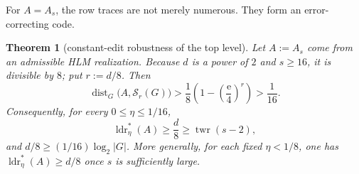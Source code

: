 \documentclass[11pt]{article}
\theoremstyle{plain}
\newtheorem{theorem}{Theorem}
\theoremstyle{definition}
\numberwithin{theorem}{section}
\newcommand{\abs}[1]{\lvert #1\rvert}
\newcommand{\twr}{\operatorname{twr}}
\newcommand{\ldrs}{\operatorname{ldr}^{*}}
\newcommand{\Stable}{\mathcal{S}}
\newcommand{\econst}{\mathrm e}
\begin{document}
For $A=A_s$, the row traces are not merely numerous.  They form an
error-correcting code.

\begin{theorem}[constant-edit robustness of the top level]\label{thm:robust}
Let $A:=A_s$ come from an admissible HLM realization.  Because $d$ is a
power of $2$ and $s\ge16$, it is divisible by $8$; put $r:=d/8$.  Then
\begin{equation}\label{eq:robust-distance}
  \operatorname{dist}_G\bigl(A,\Stable_r(G)\bigr)
  >\frac18\left(1-\left(\frac{\econst}{4}\right)^r\right)
  >\frac1{16}.
\end{equation}
Consequently, for every $0\le\eta\le1/16$,
\[
  \ldrs_\eta(A)\ge\frac d8\ge\twr(s-2),
\]
and $d/8\ge(1/16)\log_2\abs G$.  More generally, for each fixed $\eta<1/8$, one has
$\ldrs_\eta(A)\ge d/8$ once $s$ is sufficiently large.
\end{theorem}
\end{document}
